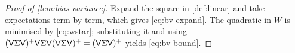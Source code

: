 \begin{proof}[Proof of \cref{lem:bias-variance}]
  Expand the square in \cref{def:linear} and take expectations term by term, which gives
  \eqref{eq:bv-expand}. The quadratic in $W$ is minimised by \eqref{eq:wstar}; substituting
  it and using $(\mathsf{V}\Sigma\mathsf{V})^{+}\mathsf{V}\Sigma\mathsf{V}(\mathsf{V}\Sigma\mathsf{V})^{+} = (\mathsf{V}\Sigma\mathsf{V})^{+}$
  yields \eqref{eq:bv-bound}.
\end{proof}
